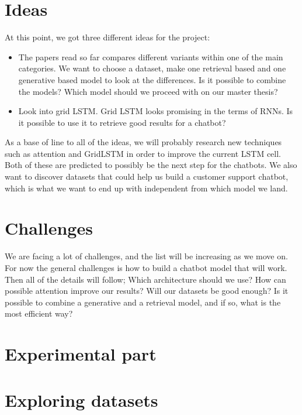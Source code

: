 \documentclass{article} %
\begin{document}
\section{Ideas}

At this point, we got three different ideas for the project:

\begin{itemize}

\item The papers read so far compares different variants within one of the main categories. We want to choose a dataset, make one retrieval based and one generative based model to look at the differences. Is it possible to combine the models? Which model should we proceed with on our master thesis? 

\item Look into grid LSTM. Grid LSTM looks promising in the terms of RNNs. Is it possible to use it to retrieve good results for a chatbot?

\end{itemize}

As a base of line to all of the ideas, we will probably research new techniques such as attention and GridLSTM in order to improve the current LSTM cell. Both of these are predicted to possibly be the next step for the chatbots. We also want to discover datasets that could help us build a customer support chatbot, which is what we want to end up with independent from which model we land.



\section{Challenges}

We are facing a lot of challenges, and the list will be increasing as we move on. For now the general challenges is how to build a chatbot model that will work. Then all of the details will follow; Which architecture should we use? How can possible attention improve our results? Will our datasets be good enough? Is it possible to combine a generative and a retrieval model, and if so, what is the most efficient way?

\section{Experimental part}
\section{Exploring datasets}
\end{document}

